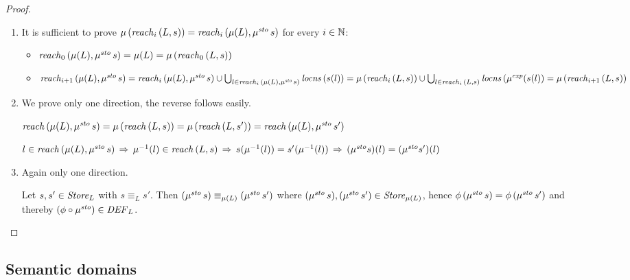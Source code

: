 \documentclass[12pt,a4paper]{report}
\newcommand{\sexp}{\nstyle{exp}}
\newcommand{\ssto}{\nstyle{sto}}
\newcommand{\DEF}{\nstyle{DEF}}
\begin{document}
\begin{proof} \
  \begin{enumerate}
    \item It is sufficient to prove $\mu\,(\reachn{i}{L}{s}) = \reachn{i}{\mu(L)}{\mu^\ssto\,s}$ for every $i\in\mathbb N$:
          \begin{itemize}
            \item $\reachn{0}{\mu(L)}{\mu^\ssto\,s} = \mu(L) = \mu\,(\reachn{0}{L}{s})$

            \item $\reachn{i+1}{\mu(L)}{\mu^\ssto\,s} \\
                  = \reachn{i}{\mu(L)}{\mu^\ssto\,s}
                    \cup \bigcup_{l\in\reachn{i}{\mu(L)}{\mu^\ssto\,s}} \locns{s(l)} \\
                  = \mu\,(\reachn{i}{L}{s})
                    \cup \bigcup_{l\in\reachn{i}{L}{s}} \locns{\mu^\sexp(s(l)} \\
                  = \mu\,(\reachn{i+1}{L}{s})$
          \end{itemize}

    \item We prove only one direction, the reverse follows easily.

          $\reach{\mu(L)}{\mu^\ssto\,s} = \mu\,(\reach{L}{s}) = \mu\,(\reach{L}{s'}) = \reach{\mu(L)}{\mu^\ssto\,s'}$

          $l \in \reach{\mu(L)}{\mu^\ssto\,s} \\
            \,\Rightarrow\,
            \mu^{-1}(l) \in \reach{L}{s} \\
            \,\Rightarrow\,
            s(\mu^{-1}(l)) = s'(\mu^{-1}(l)) \\
            \,\Rightarrow\,
            (\mu^\ssto s)(l) = (\mu^\ssto s')(l)$

    \item Again only one direction.

          Let $s,s'\in\mathit{Store}_L$ with $s \equiv_L s'$. Then $(\mu^\ssto\,s) \equiv_{\mu(L)} (\mu^\ssto\,s')$
          where $(\mu^\ssto\,s),(\mu^\ssto\,s')\in\Store_{\mu(L)}$, hence $\phi\,(\mu^\ssto\,s)=\phi\,(\mu^\ssto\,s')$
          and thereby $(\phi \circ \mu^\ssto) \in \DEF_L$.
  \end{enumerate}
\end{proof}



\subsection{Semantic domains}
\end{document}
